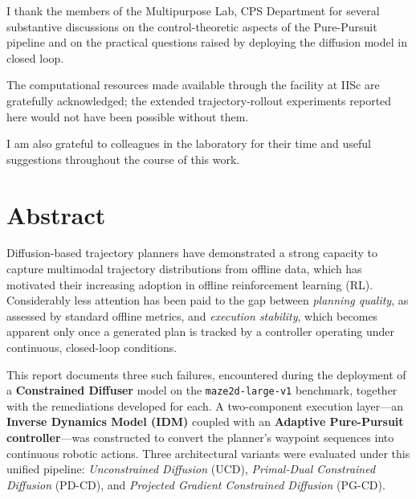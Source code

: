 \documentclass[12pt, a4paper, oneside]{report}
\theoremstyle{definition}
\begin{document}
I thank the members of the Multipurpose Lab, CPS Department for several
substantive discussions on the control-theoretic aspects of the
Pure-Pursuit pipeline and on the practical questions raised by
deploying the diffusion model in closed loop.

The computational resources made available through the
facility at IISc are
gratefully acknowledged; the extended trajectory-rollout experiments
reported here would not have been possible without them.

I am also grateful to colleagues in the laboratory for their time
and useful suggestions throughout the course of this work.

\cleardoublepage

\chapter*{Abstract}
{}

Diffusion-based trajectory planners have demonstrated a strong
capacity to capture multimodal trajectory distributions from
offline data, which has motivated their increasing adoption in
offline reinforcement learning (RL). Considerably less attention
has been paid to the gap between \emph{planning quality}, as
assessed by standard offline metrics, and \emph{execution
stability}, which becomes apparent only once a generated plan is
tracked by a controller operating under continuous, closed-loop
conditions.

This report documents three such failures, encountered during the
deployment of a \textbf{Constrained Diffuser} model on the
\texttt{maze2d-large-v1} benchmark, together with the remediations
developed for each. A two-component execution layer---an
\textbf{Inverse Dynamics Model (IDM)} coupled with an
\textbf{Adaptive Pure-Pursuit controller}---was constructed to
convert the planner's waypoint sequences into continuous robotic
actions. Three architectural variants were evaluated under this
unified pipeline: \textit{Unconstrained Diffusion} (UCD),
\textit{Primal-Dual Constrained Diffusion} (PD-CD), and
\textit{Projected Gradient Constrained Diffusion} (PG-CD).
\end{document}
